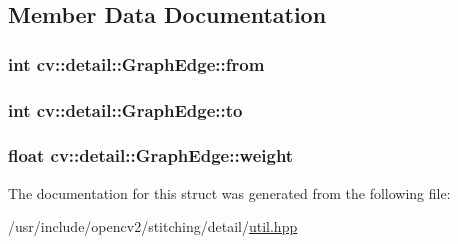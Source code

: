 \subsection{Member Data Documentation}
\hypertarget{structcv_1_1detail_1_1GraphEdge_ac4e43b1421e87ba73232f9d502925b49}{
\subsubsection[{from}]{\setlength{\rightskip}{0pt plus 5cm}int cv\-::detail\-::\-Graph\-Edge\-::from}}\label{structcv_1_1detail_1_1GraphEdge_ac4e43b1421e87ba73232f9d502925b49}
\hypertarget{structcv_1_1detail_1_1GraphEdge_a7ee67c4025576238d703f2b51bdcaa51}{
\subsubsection[{to}]{\setlength{\rightskip}{0pt plus 5cm}int cv\-::detail\-::\-Graph\-Edge\-::to}}\label{structcv_1_1detail_1_1GraphEdge_a7ee67c4025576238d703f2b51bdcaa51}
\hypertarget{structcv_1_1detail_1_1GraphEdge_a9efad8a7b27a03e6029a75413aed60ae}{
\subsubsection[{weight}]{\setlength{\rightskip}{0pt plus 5cm}float cv\-::detail\-::\-Graph\-Edge\-::weight}}\label{structcv_1_1detail_1_1GraphEdge_a9efad8a7b27a03e6029a75413aed60ae}


The documentation for this struct was generated from the following file\-:\begin{DoxyCompactItemize}
\item 
/usr/include/opencv2/stitching/detail/\hyperlink{util_8hpp}{util.\-hpp}\end{DoxyCompactItemize}
